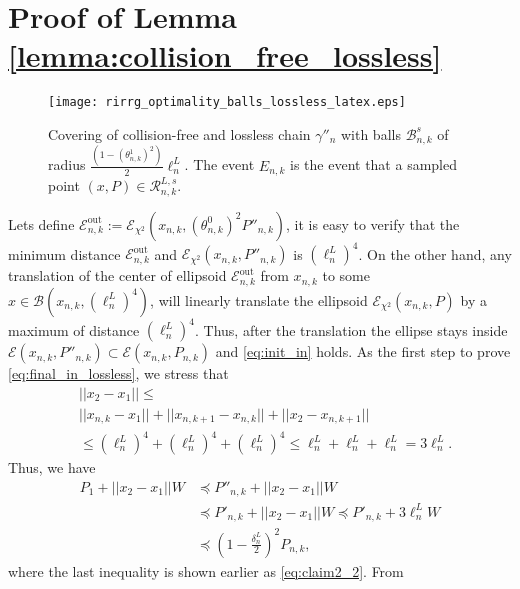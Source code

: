 \documentclass[Afour,sageh,times]{sagej}
\begin{document}
\section{Proof of Lemma \ref{lemma:collision_free_lossless}\label{appendix:collision_free_lossless}}
\begin{figure}[ht!]
\centering
\texttt{[image: rirrg\_optimality\_balls\_lossless\_latex.eps]}
\caption{Covering of collision-free and lossless chain $\gamma''_n$ with balls $\mathcal{B}^s_{n,k}$ of radius $\frac{(1-(\theta^1_{n,k})^2)}{2}\ell^L_n$. The event $E_{n,k}$ is the event that a sampled point $(x,P)\in\mathcal{R}^{L,s}_{n,k}$.}
\label{fig:covering_balls_lossless}
\end{figure}
Lets define $\mathcal{E}^{\text{out}}_{n,k}:=\mathcal{E}_{\chi^2}(x_{n,k},{(\theta^0_{n,k})^2}P''_{n,k})$, it is easy to verify that the minimum distance $\mathcal{E}^{\text{out}}_{n,k}$ and $\mathcal{E}_{\chi^2}(x_{n,k},P''_{n,k})$ is $(\ell^L_n)^4$. On the other hand, any translation of the center of ellipsoid  $\mathcal{E}^{\text{out}}_{n,k}$ from $x_{n,k}$ to some  $x\in\mathcal{B}(x_{n,k},(\ell^L_n)^4)$, will linearly translate the ellipsoid $\mathcal{E}_{\chi^2}\left(x_{n,k},P\right)$ by a maximum of distance $(\ell^L_n)^4$.
Thus, after the translation the ellipse stays inside $\mathcal{E}(x_{n,k},P''_{n,k}) \subset \mathcal{E}(x_{n,k}, P_{n,k}) $ and \eqref{eq:init_in} holds. 
As the first step to prove \eqref{eq:final_in_lossless}, we stress that  
\begin{align*}
 &||x_2-x_1|| \leq \\
 &||x_{n,k}-x_1 ||+ ||x_{n,k+1}- x_{n,k} ||+||x_2-x_{n,k+1}||\\
 &\leq (\ell^L_n)^4 + (\ell^L_n)^4 + (\ell^L_n)^4 \leq \ell^L_n + \ell^L_n + \ell^L_n = 3\ell^L_n.  
\end{align*}
Thus, we have
\begin{align} \nonumber
     P_1+||x_2-x_1||W &\preceq  P''_{n,k}+||x_2-x_1||W \\ \nonumber
     &\preceq P'_{n,k}+||x_2-x_1||W \preceq 
     P'_{n,k}+ 3 \ell^L_n W\\ \label{eq:final_ell}
     &\preceq \left(1-\frac{\delta^L_n}{2}\right)^2 P_{n,k},
\end{align}
where the last inequality is shown earlier as \eqref{eq:claim2_2}. From 
\end{document}
